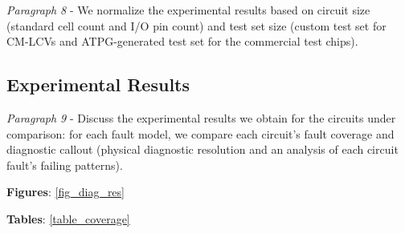 \documentclass[journal]{IEEEtran}
\begin{document}



\textit{Paragraph 8} - We normalize the experimental results based on circuit size (standard cell count and I/O pin count) and test set size (custom test set for CM-LCVs and ATPG-generated test set for the commercial test chips).

\subsection{Experimental Results} \label{exp_results}
\textit{Paragraph 9} - Discuss the experimental results we obtain for the circuits under comparison: for each fault model, we compare each circuit's fault coverage and diagnostic callout (physical diagnostic resolution and an analysis of each circuit fault's failing patterns).

\textbf{Figures}: \ref{fig_diag_res}

\textbf{Tables}: \ref{table_coverage}
\end{document}
